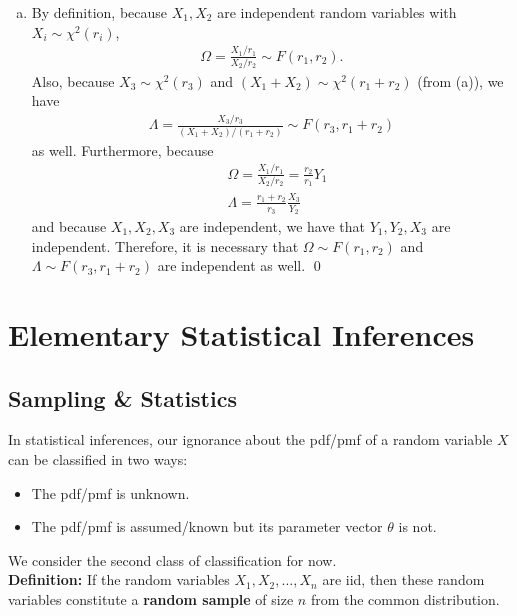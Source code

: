\documentclass{book}
\theoremstyle{definition}
\newcommand{\f}[2]{\frac{#1}{#2}}
\begin{document}
\begin{enumerate}[(a)]
	
	
	
	
	\item By definition, because $X_1, X_2$ are independent random variables with $X_i \sim \chi^2(r_i)$, 
	\begin{align}
	\Omega = \f{X_1/r_1}{X_2/r_2} \sim F(r_1, r_2).
	\end{align}
	Also, because $X_3 \sim \chi^2(r_3)$ and $(X_1 + X_2) \sim \chi^2(r_1 + r_2)$ (from (a)), we have
	\begin{align}
	\Lambda = \f{X_3/r_3}{(X_1 + X_2)/(r_1 + r_2)} \sim F(r_3, r_1 + r_2)
	\end{align}
	as well. Furthermore, because 
	\begin{align}
	&\Omega = \f{X_1/r_1}{X_2/r_2} = \f{r_2}{r_1}Y_1\\
	&\Lambda = \f{r_1+r_2}{r_3}\f{X_3}{Y_2}
	\end{align}
	and because $X_1, X_2, X_3$ are independent, we have that $Y_1, Y_2, X_3$ are independent. Therefore, it is necessary that $\Omega \sim F(r_1, r_2)$ and $\Lambda \sim F(r_3, r_1 + r_2)$ are independent as well. \qed
	
\end{enumerate}












\chapter{Elementary Statistical Inferences}
\newpage

\section{Sampling \& Statistics}

In statistical inferences, our ignorance about the pdf/pmf of a random variable $X$ can be classified in two ways:
\begin{itemize}
	\item The pdf/pmf is unknown.
	\item The pdf/pmf is assumed/known but its parameter vector $\theta$ is not.
\end{itemize}

We consider the second class of classification for now.\\

\noindent \textbf{Definition:} If the random variables $X_1, X_2, \dots, X_n$ are iid, then these random variables constitute a \textbf{random sample} of size $n$ from the common distribution. \\
\end{document}
